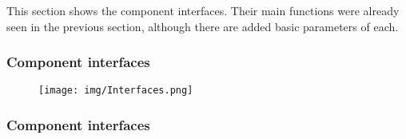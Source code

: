 	This section shows the component interfaces. Their main functions were already seen in the previous section, although there are added basic parameters of each. 
	\subsubsection{Component interfaces}	
		\begin{figure}[h]
			\texttt{[image: img/Interfaces.png]}
		\end{figure}
		
			
	\subsubsection{Component interfaces}